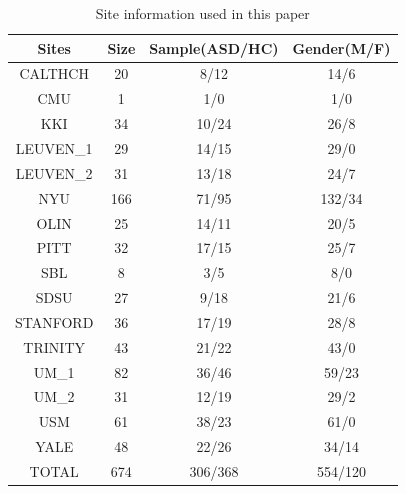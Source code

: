 \documentclass[journal,twoside,web]{ieeecolor}
\begin{document}
\begin{table}
	\centering
	\caption{Site information used in this paper}
	\label{Table1}
	\tabcolsep=0.35cm
	\begin{tabular*}{0.45\textwidth}{cccc} 
		\toprule
		\textbf{Sites} & \textbf{Size} & \textbf{Sample(ASD/HC)} & \textbf{Gender(M/F)}  \\ 
		\midrule
		CALTHCH        & 20            & 8/12                    & 14/6                  \\
		CMU            & 1             & 1/0                     & 1/0                   \\
		KKI            & 34            & 10/24                   & 26/8                  \\
		LEUVEN\_1      & 29            & 14/15                   & 29/0                  \\
		LEUVEN\_2      & 31            & 13/18                   & 24/7                  \\
		NYU            & 166           & 71/95                   & 132/34                \\
		OLIN           & 25            & 14/11                   & 20/5                  \\
		PITT           & 32            & 17/15                   & 25/7                  \\
		SBL            & 8             & 3/5                     & 8/0                   \\
		SDSU           & 27            & 9/18                    & 21/6                  \\
		STANFORD       & 36            & 17/19                   & 28/8                  \\
		TRINITY        & 43            & 21/22                   & 43/0                  \\
		UM\_1          & 82            & 36/46                   & 59/23                 \\
		UM\_2          & 31            & 12/19                   & 29/2                  \\
		USM            & 61            & 38/23                   & 61/0                  \\
		YALE           & 48            & 22/26                   & 34/14                 \\
		TOTAL          & 674           & 306/368                 & 554/120               \\
		\bottomrule
	\end{tabular*}
\end{table}
\end{document}
